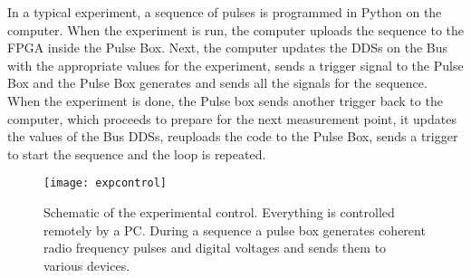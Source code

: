In a typical experiment, a sequence of pulses is programmed in Python on the computer. When the experiment is run, the computer uploads the sequence to the FPGA inside the Pulse Box. Next, the computer updates the DDSs on the Bus with the appropriate values for the experiment, sends a trigger signal to the Pulse Box and the Pulse Box generates and sends all the signals for the sequence. When the experiment is done, the Pulse box sends another trigger back to the computer, which proceeds to prepare for the next measurement point, it updates the values of the Bus DDSs, reuploads the code to the Pulse Box, sends a trigger to start the sequence and the loop is repeated.

\begin{figure}
\centering
\texttt{[image: expcontrol]}
\caption{Schematic of the experimental control. Everything is controlled remotely by a PC. During a sequence a pulse box generates coherent radio frequency pulses and digital voltages and sends them to various devices.}
\label{expcontrol}
\end{figure}

